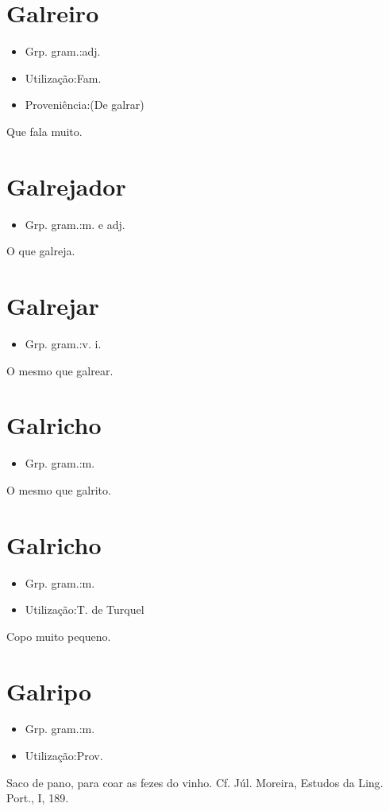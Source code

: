 \section{Galreiro}
\begin{itemize}
\item {Grp. gram.:adj.}
\end{itemize}
\begin{itemize}
\item {Utilização:Fam.}
\end{itemize}
\begin{itemize}
\item {Proveniência:(De \textunderscore galrar\textunderscore )}
\end{itemize}
Que fala muito.
\section{Galrejador}
\begin{itemize}
\item {Grp. gram.:m.  e  adj.}
\end{itemize}
O que galreja.
\section{Galrejar}
\begin{itemize}
\item {Grp. gram.:v. i.}
\end{itemize}
O mesmo que \textunderscore galrear\textunderscore .
\section{Galricho}
\begin{itemize}
\item {Grp. gram.:m.}
\end{itemize}
O mesmo que \textunderscore galrito\textunderscore .
\section{Galricho}
\begin{itemize}
\item {Grp. gram.:m.}
\end{itemize}
\begin{itemize}
\item {Utilização:T. de Turquel}
\end{itemize}
Copo muito pequeno.
\section{Galripo}
\begin{itemize}
\item {Grp. gram.:m.}
\end{itemize}
\begin{itemize}
\item {Utilização:Prov.}
\end{itemize}
Saco de pano, para coar as fezes do vinho. Cf. Júl. Moreira, \textunderscore Estudos da Ling. Port.\textunderscore , I, 189.
